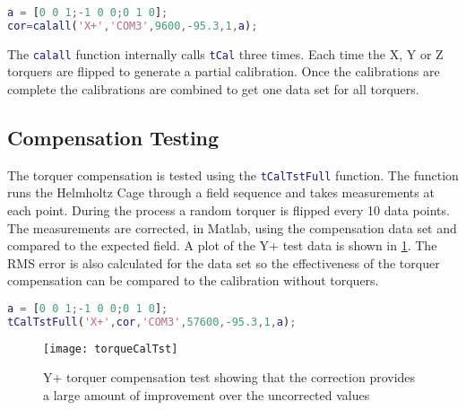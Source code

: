 \begin{lstlisting}[style=code,caption={Torquer compensation for the X+ \ac{SPB}},label={lst:tq-comp-gen},language=Matlab]
a = [0 0 1;-1 0 0;0 1 0];
cor=calall('X+','COM3',9600,-95.3,1,a);
\end{lstlisting}

The \lstinline[style=code,language=Matlab]$calall$ function internally calls \lstinline[style=code,language=Matlab]$tCal$ three times. Each time the X, Y or Z torquers are flipped to generate a partial calibration. Once the calibrations are complete the calibrations are combined to get one data set for all torquers.

\subsection{Compensation Testing}

The torquer compensation is tested using the \lstinline[style=code,language=Matlab]$tCalTstFull$ function. The function runs the Helmholtz Cage through a field sequence and takes measurements at each point. During the process a random torquer is flipped every 10 data points. The measurements are corrected, in Matlab, using the compensation data set and compared to the expected field. A plot of the Y+ test data is shown in \cref{fig:tqtst}. The RMS error is also calculated for the data set so the effectiveness of the torquer compensation can be compared to the calibration without torquers.

\begin{lstlisting}[style=code,caption={Running torquer compensation test for the X+ \ac{SPB}},label={lst:tCalTst},language=Matlab]
a = [0 0 1;-1 0 0;0 1 0];
tCalTstFull('X+',cor,'COM3',57600,-95.3,1,a);
\end{lstlisting}

\begin{figure}[!ht]
    \centering
    \texttt{[image: torqueCalTst]}
  \caption{Y+ torquer compensation test showing that the correction provides a large amount of improvement over the uncorrected values}
    \label{fig:tqtst}
\end{figure}

